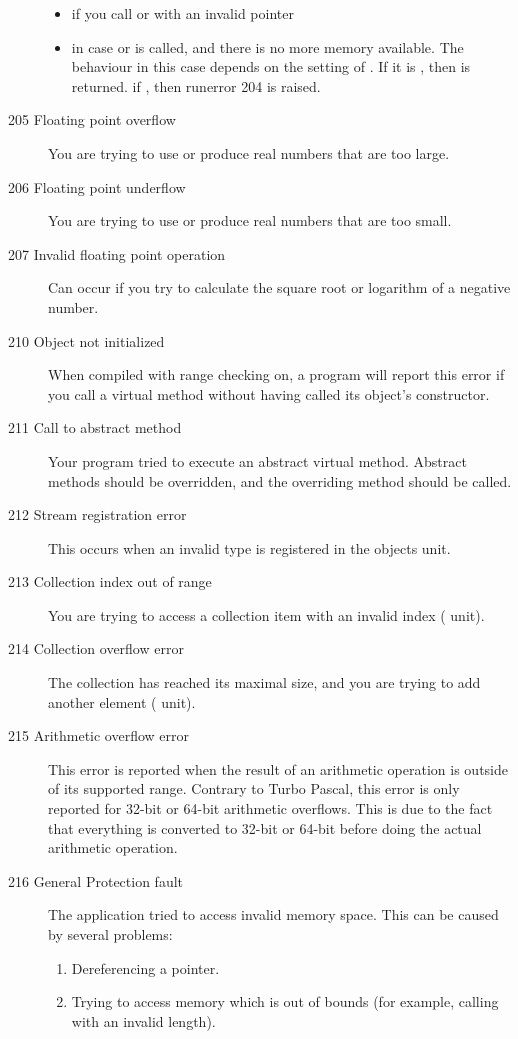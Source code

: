 \begin{description}
\begin{itemize}
\item if you call  or  with an invalid pointer
\item in case  or  is called, and there is no more memory 
available. The behaviour in this case depends on the setting of 
. If it is , then  is returned. 
if , then runerror 204 is raised.
\end{itemize}
\item [205  Floating point overflow]
You are trying to use or produce real numbers that are too large.
\item [206  Floating point underflow]
You are trying to use or produce real numbers that are too small.
\item [207  Invalid floating point operation]
Can occur if you try to calculate the square root or logarithm of a negative
number.
\item [210  Object not initialized]
When compiled with range checking on, a program will report this error if
you call a virtual method without having called its object's constructor.
\item [211  Call to abstract method]
Your program tried to execute an abstract virtual method. Abstract methods
should be overridden, and the overriding method should be called.
\item [212  Stream registration error]
This occurs when an invalid type is registered in the objects unit.
\item [213  Collection index out of range]
You are trying to access a collection item with an invalid index
( unit).
\item [214  Collection overflow error]
The collection has reached its maximal size, and you are trying to add
another element ( unit).
\item[215 Arithmetic overflow error]
This error is reported when the result of an arithmetic operation
is outside of its supported range. Contrary to Turbo Pascal, this error
is only reported for 32-bit or 64-bit arithmetic overflows. This is due
to the fact that everything is converted to 32-bit or 64-bit before
doing the actual arithmetic operation.
\item [216  General Protection fault]
The application tried to access invalid memory space. This can
be caused by several problems:
\begin{enumerate}
 \item Dereferencing a  pointer.
 \item Trying to access memory which is out of bounds
       (for example, calling  with an invalid length).
\end{enumerate}


\end{description}
